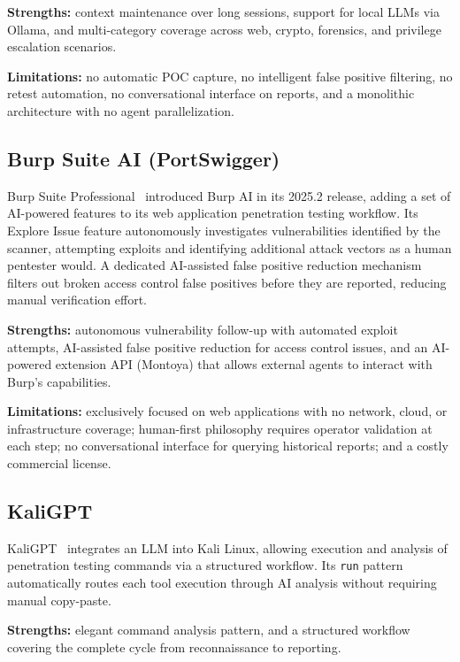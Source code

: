 \documentclass[12pt,a4paper]{report}
\begin{document}
\textbf{Strengths:} context maintenance over long sessions, support for local LLMs
via Ollama, and multi-category coverage across web, crypto, forensics, and privilege
escalation scenarios.

\textbf{Limitations:} no automatic POC capture, no intelligent false positive
filtering, no retest automation, no conversational interface on reports, and a
monolithic architecture with no agent parallelization.

\subsection{Burp Suite AI (PortSwigger)}

Burp Suite Professional~\cite{burpsuiteAI} introduced Burp AI in its 2025.2 release,
adding a set of AI-powered features to its web application penetration testing
workflow. Its Explore Issue feature autonomously investigates vulnerabilities
identified by the scanner, attempting exploits and identifying additional attack
vectors as a human pentester would. A dedicated AI-assisted false positive reduction
mechanism filters out broken access control false positives before they are reported,
reducing manual verification effort.

\textbf{Strengths:} autonomous vulnerability follow-up with automated exploit
attempts, AI-assisted false positive reduction for access control issues, and an
AI-powered extension API (Montoya) that allows external agents to interact with
Burp's capabilities.

\textbf{Limitations:} exclusively focused on web applications with no network,
cloud, or infrastructure coverage; human-first philosophy requires operator
validation at each step; no conversational interface for querying historical
reports; and a costly commercial license.

\subsection{KaliGPT}

KaliGPT~\cite{kaligpt} integrates an LLM into Kali Linux, allowing execution and
analysis of penetration testing commands via a structured workflow. Its \texttt{run}
pattern automatically routes each tool execution through AI analysis without requiring
manual copy-paste.

\textbf{Strengths:} elegant command analysis pattern, and a structured workflow
covering the complete cycle from reconnaissance to reporting.
\end{document}
